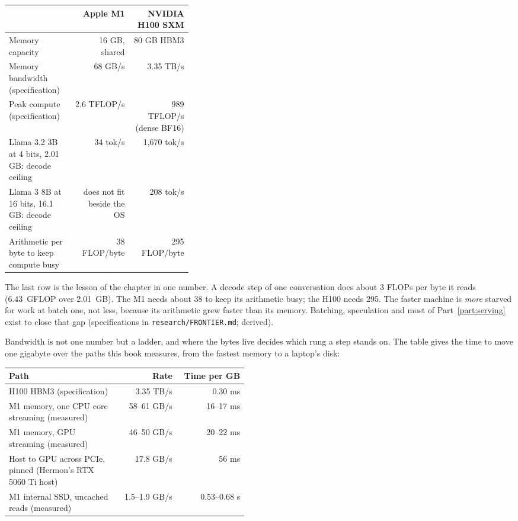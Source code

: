 \begin{center}\small
\begin{tabular}{@{}>{\raggedright\arraybackslash}p{0.36\linewidth}rr@{}}
\toprule
& Apple M1 & NVIDIA H100 SXM \\
\midrule
Memory capacity & 16 GB, shared & 80 GB HBM3 \\
Memory bandwidth (specification) & 68 GB/s & 3.35 TB/s \\
Peak compute (specification) & 2.6 TFLOP/s & 989 TFLOP/s (dense BF16) \\
Llama 3.2 3B at 4 bits, 2.01 GB: decode ceiling & 34 tok/s & 1,670 tok/s \\
Llama 3 8B at 16 bits, 16.1 GB: decode ceiling & does not fit beside the OS & 208 tok/s \\
Arithmetic per byte to keep compute busy & 38 FLOP/byte & 295 FLOP/byte \\
\bottomrule
\end{tabular}
\end{center}

\noindent The last row is the lesson of the chapter in one number. A decode
step of one conversation does about 3 FLOPs per byte it reads (6.43~GFLOP over
2.01~GB). The M1 needs about 38 to keep its arithmetic busy; the H100 needs
295. The faster machine is \emph{more} starved for work at batch one, not less,
because its arithmetic grew faster than its memory. Batching, speculation and
most of Part~\ref{part:serving} exist to close that gap (specifications in
\texttt{research/FRONTIER.md}; derived).

Bandwidth is not one number but a ladder, and where the bytes live decides
which rung a step stands on. The table gives the time to move one gigabyte over
the paths this book measures, from the fastest memory to a laptop's disk:

\begin{center}\small
\begin{tabular}{@{}>{\raggedright\arraybackslash}p{0.47\linewidth}rr@{}}
\toprule
Path & Rate & Time per GB \\
\midrule
H100 HBM3 (specification) & 3.35 TB/s & 0.30 ms \\
M1 memory, one CPU core streaming (measured) & 58--61 GB/s & 16--17 ms \\
M1 memory, GPU streaming (measured) & 46--50 GB/s & 20--22 ms \\
Host to GPU across PCIe, pinned (Hermon's RTX 5060 Ti host) & 17.8 GB/s & 56 ms \\
M1 internal SSD, uncached reads (measured) & 1.5--1.9 GB/s & 0.53--0.68 s \\
\bottomrule
\end{tabular}
\end{center}

